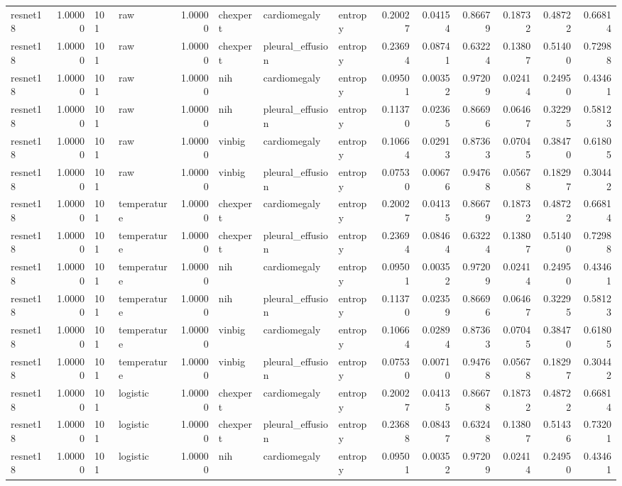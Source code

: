 \begin{tabular}{lrllrlllrrrrrr}
resnet18 & 1.00000 & 101 & raw & 1.00000 & chexpert & cardiomegaly & entropy & 0.20027 & 0.04154 & 0.86679 & 0.18732 & 0.48722 & 0.66814 \\
resnet18 & 1.00000 & 101 & raw & 1.00000 & chexpert & pleural\_effusion & entropy & 0.23694 & 0.08741 & 0.63224 & 0.13807 & 0.51400 & 0.72988 \\
resnet18 & 1.00000 & 101 & raw & 1.00000 & nih & cardiomegaly & entropy & 0.09501 & 0.00352 & 0.97209 & 0.02414 & 0.24950 & 0.43461 \\
resnet18 & 1.00000 & 101 & raw & 1.00000 & nih & pleural\_effusion & entropy & 0.11370 & 0.02365 & 0.86696 & 0.06467 & 0.32295 & 0.58123 \\
resnet18 & 1.00000 & 101 & raw & 1.00000 & vinbig & cardiomegaly & entropy & 0.10664 & 0.02913 & 0.87363 & 0.07045 & 0.38470 & 0.61805 \\
resnet18 & 1.00000 & 101 & raw & 1.00000 & vinbig & pleural\_effusion & entropy & 0.07530 & 0.00676 & 0.94768 & 0.05678 & 0.18297 & 0.30442 \\
resnet18 & 1.00000 & 101 & temperature & 1.00000 & chexpert & cardiomegaly & entropy & 0.20027 & 0.04135 & 0.86679 & 0.18732 & 0.48722 & 0.66814 \\
resnet18 & 1.00000 & 101 & temperature & 1.00000 & chexpert & pleural\_effusion & entropy & 0.23694 & 0.08464 & 0.63224 & 0.13807 & 0.51400 & 0.72988 \\
resnet18 & 1.00000 & 101 & temperature & 1.00000 & nih & cardiomegaly & entropy & 0.09501 & 0.00352 & 0.97209 & 0.02414 & 0.24950 & 0.43461 \\
resnet18 & 1.00000 & 101 & temperature & 1.00000 & nih & pleural\_effusion & entropy & 0.11370 & 0.02359 & 0.86696 & 0.06467 & 0.32295 & 0.58123 \\
resnet18 & 1.00000 & 101 & temperature & 1.00000 & vinbig & cardiomegaly & entropy & 0.10664 & 0.02894 & 0.87363 & 0.07045 & 0.38470 & 0.61805 \\
resnet18 & 1.00000 & 101 & temperature & 1.00000 & vinbig & pleural\_effusion & entropy & 0.07530 & 0.00710 & 0.94768 & 0.05678 & 0.18297 & 0.30442 \\
resnet18 & 1.00000 & 101 & logistic & 1.00000 & chexpert & cardiomegaly & entropy & 0.20027 & 0.04135 & 0.86678 & 0.18732 & 0.48722 & 0.66814 \\
resnet18 & 1.00000 & 101 & logistic & 1.00000 & chexpert & pleural\_effusion & entropy & 0.23688 & 0.08437 & 0.63248 & 0.13807 & 0.51436 & 0.73201 \\
resnet18 & 1.00000 & 101 & logistic & 1.00000 & nih & cardiomegaly & entropy & 0.09501 & 0.00352 & 0.97209 & 0.02414 & 0.24950 & 0.43461 \\

\end{tabular}
